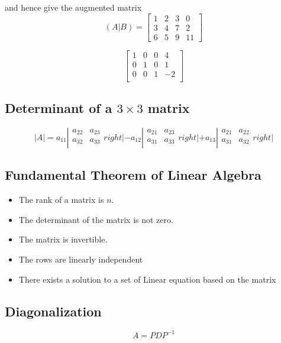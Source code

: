 \documentclass[12pt, a4paper]{article}
\begin{document}
and hence give the augmented matrix
\[
(A|B) =
  \left[\begin{array}{ccc|c}
1 & 2 & 3 & 0 \\
3 & 4 & 7 & 2 \\
6 & 5 & 9 & 11
  \end{array}\right]
\]

\[\left[\begin{array}{ccc|c}
1 & 0 & 0 & 4 \\
0 & 1 & 0 & 1 \\
0 & 0 & 1 & -2 \\
  \end{array}\right]\]


\subsection*{Determinant of a $3 \times 3$ matrix}
\[ |A| = a_{11} \left|\begin{array}{cc}
a_{22} & a_{23} \\
a_{32} & a_{33} \\
\end{array}  right| - a_{12} \left| \begin{array}{cc}
a_{21} & a_{23} \\
a_{31} & a_{33} \\
\end{array} right| + a_{13} \left|\begin{array}{cc}
a_{21} & a_{22} \\
a_{31} & a_{32} \\
\end{array}  right| \]
\newpage
\subsection*{Fundamental Theorem of Linear Algebra}
\begin{itemize}
\item The rank of a matrix is $n$.
\item The determinant of the matrix is not zero.
\item The matrix is invertible.
\item The rows are linearly independent
\item There exists a solution to a set of Linear equation based on the matrix
\end{itemize}
\subsection*{Diagonalization}
\[ A = PDP^{-1} \]
\end{document}

